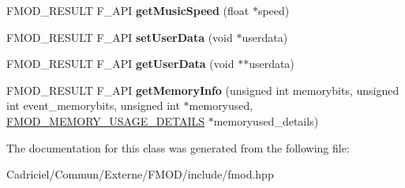 \begin{DoxyCompactItemize}
\item 
F\+M\+O\+D\+\_\+\+R\+E\+S\+U\+LT F\+\_\+\+A\+PI {\bfseries get\+Music\+Speed} (float $\ast$speed)\hypertarget{class_f_m_o_d_1_1_sound_a22e4865bfd9f4bf40633671439dade82}{}\label{class_f_m_o_d_1_1_sound_a22e4865bfd9f4bf40633671439dade82}

\item 
F\+M\+O\+D\+\_\+\+R\+E\+S\+U\+LT F\+\_\+\+A\+PI {\bfseries set\+User\+Data} (void $\ast$userdata)\hypertarget{class_f_m_o_d_1_1_sound_ac921f8c260ef5b396a837016d5882713}{}\label{class_f_m_o_d_1_1_sound_ac921f8c260ef5b396a837016d5882713}

\item 
F\+M\+O\+D\+\_\+\+R\+E\+S\+U\+LT F\+\_\+\+A\+PI {\bfseries get\+User\+Data} (void $\ast$$\ast$userdata)\hypertarget{class_f_m_o_d_1_1_sound_a829f8e68b254764374c38e6e23f7f8df}{}\label{class_f_m_o_d_1_1_sound_a829f8e68b254764374c38e6e23f7f8df}

\item 
F\+M\+O\+D\+\_\+\+R\+E\+S\+U\+LT F\+\_\+\+A\+PI {\bfseries get\+Memory\+Info} (unsigned int memorybits, unsigned int event\+\_\+memorybits, unsigned int $\ast$memoryused, \hyperlink{struct_f_m_o_d___m_e_m_o_r_y___u_s_a_g_e___d_e_t_a_i_l_s}{F\+M\+O\+D\+\_\+\+M\+E\+M\+O\+R\+Y\+\_\+\+U\+S\+A\+G\+E\+\_\+\+D\+E\+T\+A\+I\+LS} $\ast$memoryused\+\_\+details)\hypertarget{class_f_m_o_d_1_1_sound_abf8d14ac330b572417f9f949456848d5}{}\label{class_f_m_o_d_1_1_sound_abf8d14ac330b572417f9f949456848d5}

\end{DoxyCompactItemize}


The documentation for this class was generated from the following file\+:\begin{DoxyCompactItemize}
\item 
Cadriciel/\+Commun/\+Externe/\+F\+M\+O\+D/include/fmod.\+hpp\end{DoxyCompactItemize}
